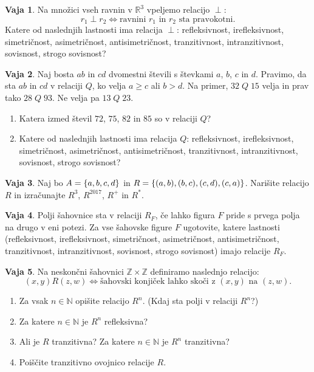 \documentclass{article}
\newcommand{\NN}{\mathbb{N}}
\newcommand{\ZZ}{\mathbb{Z}}
\newcommand{\RR}{\mathbb{R}}
\theoremstyle{definition}
\newtheorem{vaja}{Vaja}
\begin{document}
\begin{vaja}
  Na množici vseh ravnin v $\RR^3$ vpeljemo relacijo $\perp$:
  \[r_1 \perp r_2 \iff \text{ravnini $r_1$ in $r_2$ sta pravokotni}.\]
  Katere od naslednjih lastnosti ima relacija $\perp$: refleksivnost, irefleksivnost, simetričnost, asimetričnost, antisimetričnost, tranzitivnost, intranzitivnost, sovisnost, strogo sovisnost?
\end{vaja}

\begin{vaja}
  Naj bosta $ab$ in $cd$ dvomestni števili s števkami $a$, $b$, $c$ in $d$. Pravimo, da sta $ab$ in $cd$ v relaciji $Q$, ko velja $a \geq c$ ali $b > d$. Na primer, $32 \; Q \; 15$ velja in prav tako $28 \; Q \; 93$. Ne velja pa $13 \; Q \; 23$.
  \begin{enumerate}
    \item
      Katera izmed števil $72$, $75$, $82$ in $85$ so v relaciji $Q$?
    \item
      Katere od naslednjih lastnosti ima relacija $Q$: refleksivnost, irefleksivnost, simetričnost, asimetričnost, antisimetričnost, tranzitivnost, intranzitivnost, sovisnost, strogo sovisnost?
  \end{enumerate}
\end{vaja}

\begin{vaja}
  Naj bo $A = \set{a,b,c,d}$ in $R = \set{(a,b),(b,c),(c,d),(c,a)}$. Narišite relacijo $R$ in izračunajte $R^3$, $R^{2017}$, $R^+$ in $R^*$.
\end{vaja}

\begin{vaja}
  Polji šahovnice sta v relaciji $R_F$, če lahko figura $F$ pride s prvega polja na drugo
  v eni potezi. Za vse šahovske figure $F$ ugotovite, katere lastnosti (refleksivnost, irefleksivnost, simetričnost, asimetričnost, antisimetričnost, tranzitivnost, intranzitivnost, sovisnost, strogo sovisnost) imajo relacije $R_F$.
\end{vaja}

\begin{vaja}
  Na neskončni šahovnici $\ZZ \times \ZZ$ definiramo naslednjo relacijo:
  \begin{equation*}
    (x,y) R (z,w) \iff \text{šahovski konjiček lahko skoči z $(x,y)$ na $(z,w)$}.
  \end{equation*}
  \begin{enumerate}
    \item Za vsak $n \in \NN$ opišite relacijo $R^n$. (Kdaj sta polji v relaciji $R^n$?)
    \item Za katere $n \in \NN$ je $R^n$ refleksivna?
    \item Ali je $R$ tranzitivna? Za katere $n \in \NN$ je $R^n$ tranzitivna?
    \item Poiščite tranzitivno ovojnico relacije $R$.
  \end{enumerate}
\end{vaja}
\end{document}

